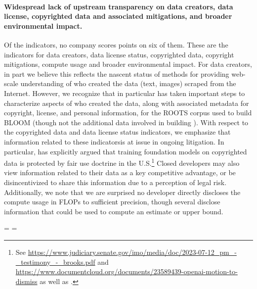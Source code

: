 \paragraph{Widespread lack of upstream transparency on data creators, data license, copyrighted data and associated mitigations, and broader environmental impact.} 
Of the \numupstreamindicators indicators, no company scores points on six of them.
These are the indicators for data creators, data license status, copyrighted data, copyright mitigations, compute usage and broader environmental impact.
For data creators, in part we believe this reflects the nascent status of methods for providing web-scale understanding of who created the data (\eg text, images) scraped from the Internet. 
However, we recognize that \huggingface in particular has taken important steps to characterize aspects of who created the data, along with associated metadata for copyright, license, and personal information, for the ROOTS corpus used to build BLOOM (though not the additional data involved in building \bloomz). 
With respect to the copyrighted data and data license status indicators, we emphasize that information related to these indicatorsis at issue in ongoing litigation. 
In particular, \stability has explicitly argued that training foundation models on copyrighted data is protected by fair use doctrine in the U.S.\footnote{See \url{https://www.judiciary.senate.gov/imo/media/doc/2023-07-12_pm_-_testimony_-_brooks.pdf} and \url{https://www.documentcloud.org/documents/23589439-openai-motion-to-dismiss} as well as \citet{lemley2020fair}.} 
Closed developers may also view information related to their data as a key competitive advantage, or be disincentivized to share this information due to a perception of legal risk.
Additionally, we note that we are surprised no developer directly discloses the compute usage in FLOPs to sufficient precision, though several disclose information that could be used to compute an estimate or upper bound. 

\edef\originalwidth{\the\pdfpagewidth}
\edef\originalheight{\the\pdfpageheight}




\eject
\pdfpageheight=\originalwidth
\newlength{\mylength}
\setlength{\mylength}{\originalheight-3.4cm}
\pdfpagewidth=\mylength
{}

